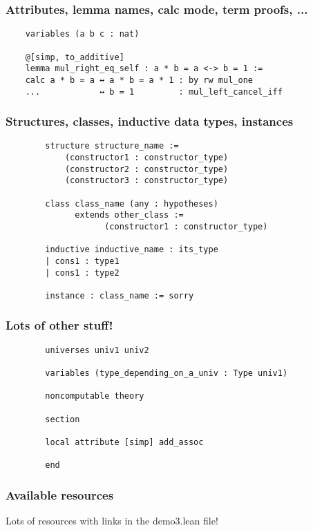 \documentclass{beamer}
\begin{document}
 \begin{frame}[fragile]
    \frametitle{Attributes, lemma names, calc mode, term proofs, ...}

    \begin{lstlisting}
    variables (a b c : nat)

    @[simp, to_additive] 
    lemma mul_right_eq_self : a * b = a <-> b = 1 :=
    calc a * b = a ↔ a * b = a * 1 : by rw mul_one
    ...            ↔ b = 1         : mul_left_cancel_iff
    \end{lstlisting}
 \end{frame}

\begin{frame}[fragile]
    \frametitle{Structures, classes, inductive data types, instances}

    \begin{lstlisting}
        structure structure_name := 
            (constructor1 : constructor_type)
            (constructor2 : constructor_type)
            (constructor3 : constructor_type)

        class class_name (any : hypotheses) 
              extends other_class :=
                    (constructor1 : constructor_type)

        inductive inductive_name : its_type
        | cons1 : type1
        | cons1 : type2

        instance : class_name := sorry
    \end{lstlisting}

\end{frame}

\begin{frame}[fragile]
    \frametitle{Lots of other stuff!}

    \begin{lstlisting}
        universes univ1 univ2 

        variables (type_depending_on_a_univ : Type univ1)

        noncomputable theory

        section 

        local attribute [simp] add_assoc

        end
    \end{lstlisting}

\end{frame}

\begin{frame}
    \frametitle{Available resources}

    Lots of resources with links in the demo3.lean file!
\end{frame}
\end{document}
